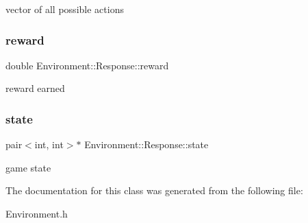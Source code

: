 vector of all possible actions \mbox{\label{class_environment_1_1_response_a38f0083f3e1de4a30c2379de47625943}} 
\subsubsection{\texorpdfstring{reward}{reward}}
{\footnotesize\ttfamily double Environment\+::\+Response\+::reward}

reward earned \mbox{\label{class_environment_1_1_response_ab20f0a5064e6c7bec33600efce584489}} 
\subsubsection{\texorpdfstring{state}{state}}
{\footnotesize\ttfamily pair$<$int, int$>$$\ast$ Environment\+::\+Response\+::state}

game state 

The documentation for this class was generated from the following file\+:\begin{DoxyCompactItemize}
\item 
Environment.\+h\end{DoxyCompactItemize}
